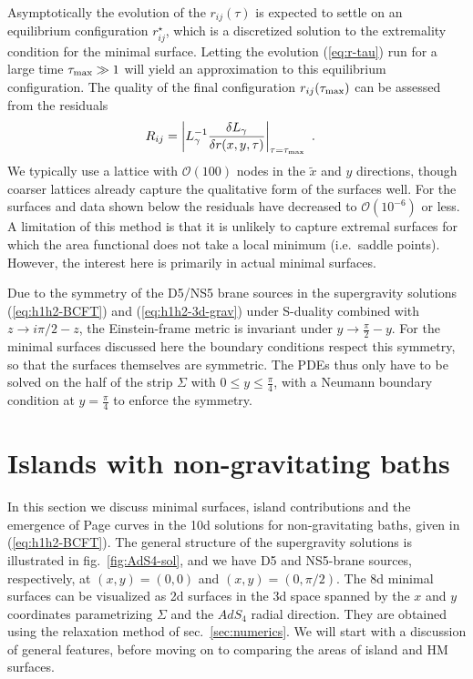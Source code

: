 \documentclass[aps,prd,11pt,notitlepage,longbibliography,nofootinbib,tightenlines,preprintnumbers]{revtex4-1}
\begin{document}
Asymptotically the evolution of the $r_{ij}(\tau)$ is expected to settle on an equilibrium configuration $r^\star_{ij}$, which is a discretized solution to the extremality condition for the minimal surface.
%
Letting the evolution (\ref{eq:r-tau}) run for a large time $\tau_{\rm max}\gg 1$ will yield an approximation to this equilibrium configuration. 
The quality of the final configuration $r_{ij}(\tau_{\rm max})$ can be assessed from the residuals
\begin{align}\label{eq:residuals}
	R_{ij}&=\left|L_\gamma^{-1}\frac{\delta L_\gamma}{\delta r(x,y,\tau)}\right|_{\tau=\tau_{\rm max}}~.
\end{align}
We typically use a lattice with $\mathcal O(100)$ nodes in the $\tilde x$ and $y$ directions,
though coarser lattices already capture the qualitative form of the surfaces well.
For the surfaces and data shown below the residuals have decreased to $\mathcal O(10^{-6})$ or less.
A limitation of this method is that it is unlikely to capture extremal surfaces for which the area functional does not take a local minimum (i.e.\ saddle points). However, the interest here is primarily in actual minimal surfaces.


Due to the symmetry of the D5/NS5 brane sources in the supergravity solutions (\ref{eq:h1h2-BCFT}) and (\ref{eq:h1h2-3d-grav}) under S-duality combined with $z\rightarrow i\pi/2 -z$, the Einstein-frame metric is invariant under $y\rightarrow \frac{\pi}{2}-y$. 
For the minimal surfaces discussed here the boundary conditions respect this symmetry, so that the surfaces themselves are symmetric.
The PDEs thus only have to be solved on the half of the strip $\Sigma$ with $0\leq y\leq\frac{\pi}{4}$, with a Neumann boundary condition at $y=\frac{\pi}{4}$ to enforce the symmetry.



\section{Islands with non-gravitating baths}\label{sec:islands}





In this section we discuss minimal surfaces, island contributions and the emergence of Page curves in the 10d solutions for non-gravitating baths, given in (\ref{eq:h1h2-BCFT}). 
The general structure of the supergravity solutions is illustrated in fig.~\ref{fig:AdS4-sol}, and we have D5 and NS5-brane sources, respectively, at $(x,y)=(0,0)$ and $(x,y)=(0,\pi/2)$.
The 8d minimal surfaces can be visualized as 2d surfaces in the 3d space spanned by the $x$ and $y$ coordinates parametrizing $\Sigma$ and the $AdS_4$ radial direction.
They are obtained using the relaxation method of sec.~\ref{sec:numerics}. 
We will start with a discussion of general features, before moving on to comparing the areas of island and HM surfaces.
\end{document}
